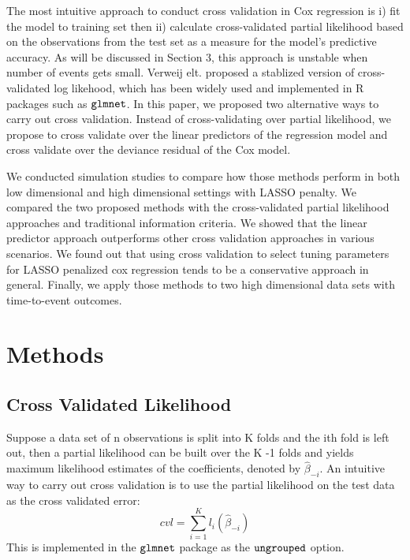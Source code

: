 \documentclass{article}\usepackage[]{graphicx}\usepackage[]{color}
\begin{document}
\par The most intuitive approach to conduct cross validation in Cox regression is i) fit the model to training set then ii) calculate cross-validated partial likelihood based on the observations from the test set as a measure for the model's predictive accuracy. As will be discussed in Section 3, this approach is unstable when number of events gets small. Verweij elt. \citep{Verweij1993} proposed a stablized version of cross-validated log likehood, which has been widely used and implemented in R packages such as $\tt{glmnet}$. In this paper, we proposed two alternative ways to carry out cross validation. Instead of cross-validating over partial likelihood, we propose to cross validate over the linear predictors of the regression model and cross validate over the deviance residual \citep{Therneau1990}of the Cox model. 

\par We conducted simulation studies to compare how those methods perform in both low dimensional and high dimensional settings with LASSO penalty. We compared the two proposed methods with the cross-validated partial likelihood approaches and traditional information criteria. We showed that the linear predictor approach outperforms other cross validation approaches in various scenarios. We found out that using cross validation to select tuning parameters for LASSO penalized cox regression tends to be a conservative approach in general. Finally, we apply those methods to two high dimensional data sets with time-to-event outcomes.

\section{Methods}

  \subsection{Cross Validated Likelihood} 
Suppose a data set of n observations is split into K folds and the ith fold is left out, then a partial likelihood can be built over the K -1 folds and yields maximum likelihood estimates of the coefficients, denoted by $\hat{\beta}_{-i}$. An intuitive way to carry out cross validation is to use the partial likelihood on the test data as the cross validated error: \begin{equation}cvl = \sum_{i=1}^{K} l_{i}(\hat{\beta}_{-i})\end{equation} This is implemented in the $\tt{glmnet}$ package as the $\tt{ungrouped}$ option. 
\end{document}
